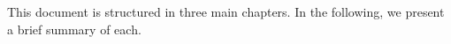 This document is structured in three main chapters. In the following, we present a brief summary of each.